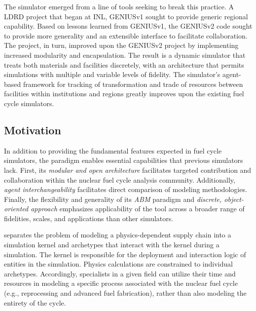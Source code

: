 The \Cyclus simulator emerged from a line of tools seeking to break this practice.  
A \gls{LDRD} project that began at \gls{INL}, 
\gls{GENIUSv1}\cite{dunzik-gougar_global_2007,jain_transitioning_2006} sought 
to provide generic regional capability.  Based on lessons learned from 
\gls{GENIUSv1}, the 
\gls{GENIUSv2}\cite{oliver_studying_2009,huff_geniusv2_2009} code sought to 
provide more generality and an extensible interface to facilitate 
collaboration.  The \Cyclus project, in turn, improved upon the \gls{GENIUSv2} 
project by implementing increased modularity and encapsulation.  The result is  
a dynamic simulator that treats both materials and facilities discretely, with 
an architecture that permits simulations with multiple and variable levels of 
fidelity. The simulator's agent-based framework for tracking of 
transformation and trade of resources between facilities within institutions 
and regions greatly improves upon the existing fuel cycle simulators.

\subsection{Motivation}

In addition to providing the fundamental features expected in fuel cycle 
simulators, the \Cyclus paradigm enables essential capabilities that previous 
simulators lack. First, its \emph{modular and open architecture}  facilitates 
targeted contribution and collaboration within the nuclear fuel cycle analysis 
community.  Additionally, \emph{agent interchangeability} facilitates direct 
comparison of modeling methodologies. Finally, the flexibility and generality 
of its \emph{\gls{ABM}} paradigm and \emph{discrete, object-oriented approach} 
emphasizes applicability of the \Cyclus tool across a broader range of 
fidelities, scales, and applications than other simulators. 

\Cyclus separates the problem of modeling a
physics-dependent supply chain into a simulation kernel and archetypes that
interact with the kernel during a simulation. The kernel is responsible for the
deployment and interaction logic of entities in the simulation. Physics
calculations are constrained to individual archetypes. Accordingly, specialists
in a given field can utilize their time and resources in modeling a specific
process associated with the nuclear fuel cycle (e.g., reprocessing and advanced
fuel fabrication), rather than also modeling the entirety of the cycle.

